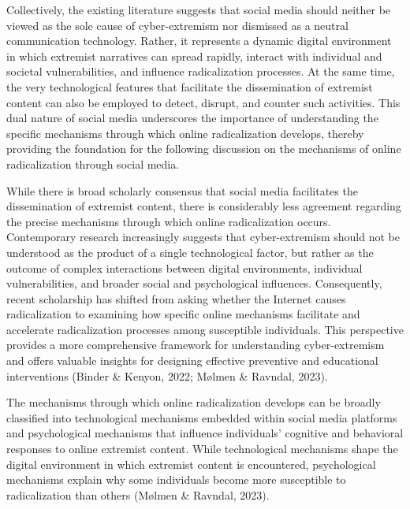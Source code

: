 \documentclass{NSP1}
\begin{document}
Collectively, the existing literature suggests that social media should neither be viewed as the sole cause of cyber-extremism nor dismissed as a neutral communication technology. Rather, it represents a dynamic digital environment in which extremist narratives can spread rapidly, interact with individual and societal vulnerabilities, and influence radicalization processes. At the same time, the very technological features that facilitate the dissemination of extremist content can also be employed to detect, disrupt, and counter such activities. This dual nature of social media underscores the importance of understanding the specific mechanisms through which online radicalization develops, thereby providing the foundation for the following discussion on the mechanisms of online radicalization through social media.

\par\medskip{}\smallskip

While there is broad scholarly consensus that social media facilitates the dissemination of extremist content, there is considerably less agreement regarding the precise mechanisms through which online radicalization occurs. Contemporary research increasingly suggests that cyber-extremism should not be understood as the product of a single technological factor, but rather as the outcome of complex interactions between digital environments, individual vulnerabilities, and broader social and psychological influences. Consequently, recent scholarship has shifted from asking whether the Internet causes radicalization to examining how specific online mechanisms facilitate and accelerate radicalization processes among susceptible individuals. This perspective provides a more comprehensive framework for understanding cyber-extremism and offers valuable insights for designing effective preventive and educational interventions (Binder \& Kenyon, 2022; Mølmen \& Ravndal, 2023).

The mechanisms through which online radicalization develops can be broadly classified into technological mechanisms embedded within social media platforms and psychological mechanisms that influence individuals' cognitive and behavioral responses to online extremist content. While technological mechanisms shape the digital environment in which extremist content is encountered, psychological mechanisms explain why some individuals become more susceptible to radicalization than others (Mølmen \& Ravndal, 2023).
\end{document}
